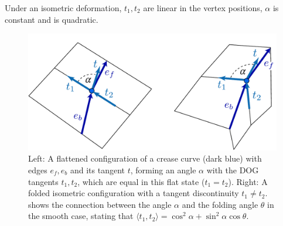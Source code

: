 Under an isometric deformation, $t_1,t_2$ are linear in the vertex positions, $\alpha$ is constant and   is quadratic.

\begin{figure} [h]
	\centering
	\includegraphics[width=0.8\linewidth]{figures/fold_angle_and_tangent_angles}
	\caption{Left: A flattened configuration of a crease curve (dark blue) with edges $e_f,e_b$ and its tangent $t$, forming an angle $\alpha$ with the DOG tangents $t_1,t_2$, which are equal in this flat state ($t_1=t_2$). Right: A folded isometric configuration with a tangent discontinuity  $t_1 \neq t_2$.  shows the connection between the angle $\alpha$ and the folding angle $\theta$ in the smooth case, stating that $\langle t_1, t_2 \rangle = \cos^2\!\alpha + \sin^2\!\alpha \cos\theta$. }
	\label{fig:fold_angle_and_tangent_angles}
\end{figure}

